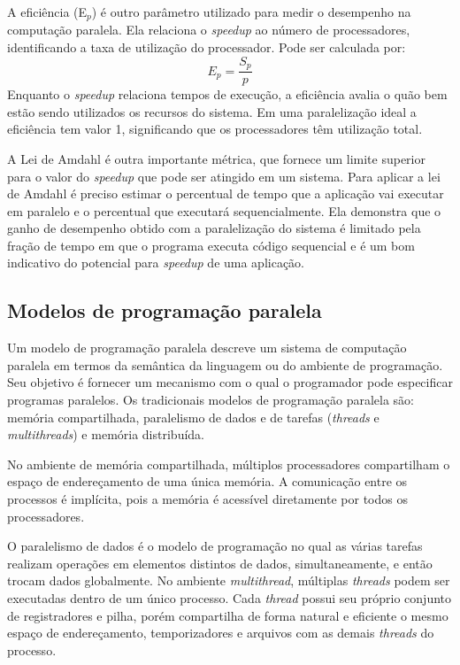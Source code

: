  A eficiência (E$_p$) é outro parâmetro utilizado para medir o desempenho na computação paralela.  Ela relaciona o \textit{speedup} ao número de processadores, identificando a taxa de utilização do processador. Pode ser calculada por: \[ E_p = \frac{S_p}{p} \]
Enquanto o \textit{speedup} relaciona tempos de execução, a eficiência avalia o quão bem estão sendo utilizados os recursos do sistema. Em uma paralelização ideal a eficiência tem valor 1, significando que os processadores têm utilização total.
		
A Lei de Amdahl é outra importante métrica, que fornece um limite superior para o valor do \textit{speedup} que pode ser atingido em um sistema. Para aplicar a lei de Amdahl é preciso estimar o percentual de tempo que a aplicação vai executar em paralelo e   o percentual que executará sequencialmente. 
Ela demonstra que o ganho de desempenho obtido com a paralelização do sistema é limitado pela fração de tempo em que o programa executa código sequencial e é um bom indicativo do potencial para \textit{speedup} de uma aplicação.


\subsection{Modelos de programação paralela}

Um modelo de programação paralela descreve um sistema de computação paralela em termos da semântica da linguagem ou do ambiente de programação. Seu objetivo é fornecer um mecanismo com o qual o programador pode especificar programas paralelos. Os tradicionais modelos de programação paralela são: memória compartilhada, paralelismo de dados e de tarefas (\textit{threads} e \textit{multithreads}) e memória distribuída.

No ambiente de memória compartilhada, múltiplos processadores compartilham o espaço de endereçamento de uma única memória. A comunicação entre os processos é implícita, pois a memória é acessível diretamente por todos os processadores. 

O paralelismo de dados é o modelo de programação no qual as várias tarefas realizam operações em elementos distintos de dados, simultaneamente, e então trocam dados globalmente. No ambiente \textit{multithread}, múltiplas \textit{threads} podem ser executadas dentro de um único processo. Cada \textit{thread} possui seu próprio conjunto de registradores e pilha, porém compartilha de forma natural e eficiente o mesmo espaço de endereçamento, temporizadores e arquivos com as demais \textit{threads} do processo. 

